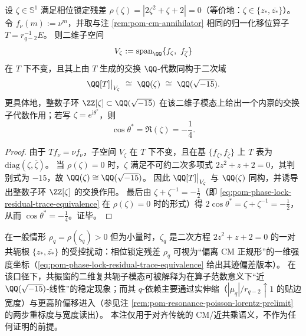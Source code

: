 \begin{proposition}\label{prop:pom-cm-rigidity-qsqrtm15}
设 \(\zeta\in\mathbb{S}^1\) 满足相位锁定残差 \(\rho(\zeta)=|2\zeta^2+\zeta+2|=0\)（等价地：\(\zeta\in\{z_\ast,\overline{z_\ast}\}\)）。
令 \(f_\nu(m):=\nu^m\)，并取与注 \ref{rem:pom-cm-annihilator} 相同的归一化移位算子 \(T=r_{q-2}^{-1}E\)。
则二维子空间
\[
V_\zeta:=\mathrm{span}_{\QQ}\{f_\zeta,\ f_{\overline{\zeta}}\}
\]
在 \(T\) 下不变，且其上由 \(T\) 生成的交换 \(\QQ\)-代数同构于二次域
\[
\QQ[T]\big|_{V_\zeta}\ \cong\ \QQ(\zeta)\ \cong\ \QQ(\sqrt{-15}).
\]
更具体地，整数子环 \(\ZZ[\zeta]\subset \QQ(\sqrt{-15})\) 在该二维子模态上给出一个内禀的交换子代数作用；若写 \(\zeta=e^{\mathrm{i}\theta^\ast}\)，则
\[
\cos\theta^\ast=\Re(\zeta)=-\frac14.
\]
\end{proposition}
\begin{proof}
由于 \(Tf_\nu=\nu f_\nu\)，子空间 \(V_\zeta\) 在 \(T\) 下不变，且在基 \(\{f_\zeta,f_{\overline{\zeta}}\}\) 上 \(T\) 表为 \(\mathrm{diag}(\zeta,\overline{\zeta})\)。
当 \(\rho(\zeta)=0\) 时，\(\zeta\) 满足不可约二次多项式 \(2z^2+z+2=0\)，其判别式为 \(-15\)，故 \(\QQ(\zeta)\cong \QQ(\sqrt{-15})\)。
因此 \(\QQ[T]\big|_{V_\zeta}\) 与 \(\QQ(\zeta)\) 同构，并诱导出整数子环 \(\ZZ[\zeta]\) 的交换作用。
最后由 \(\zeta+\zeta^{-1}=-\tfrac12\)（即 \eqref{eq:pom-phase-lock-residual-trace-equivalence} 在 \(\rho(\zeta)=0\) 时的形式）得
\(
2\cos\theta^\ast=\zeta+\zeta^{-1}=-\tfrac12
\)，
从而 \(\cos\theta^\ast=-\tfrac14\)。证毕。
\end{proof}

\begin{remark}\label{rem:pom-near-cm-stable-perturbation}
在一般情形 \(\rho_q=\rho(\zeta_q)>0\) 但为小量时，\(\zeta_q\) 是二次方程 \(2z^2+z+2=0\) 的一对共轭根 \(\{z_\ast,\overline{z_\ast}\}\) 的受控扰动：相位锁定残差 \(\rho_q\) 可视为“偏离 CM 正规形”的一维强度坐标（\eqref{eq:pom-phase-lock-residual-trace-equivalence} 给出其迹偏差版本）。
在该口径下，共振窗的二维复共轭子模态可被解释为在算子范数意义下“近 \(\QQ(\sqrt{-15})\)-线性”的稳定现象；而其 \(q\)-依赖主要通过实伸缩（\(|\mu_q|/r_{q-2}\uparrow 1\) 的贴边宽度）与更高阶偏移进入（参见注 \ref{rem:pom-resonance-poisson-lorentz-prelimit} 的两步重标度与宽度读出）。
本注仅用于对齐传统的 CM/近共乘语义，不作为任何证明的前提。
\end{remark}

